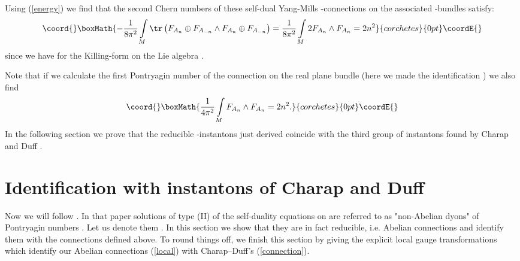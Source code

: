 \documentclass[a4paper,12pt,draft]{article}
\begin{document}
Using (\ref{energy}) we find that the second Chern numbers of these
self-dual Yang-Mills \coordHE{}-connections \coordHE{} on the 
associated \coordHE{}-bundles \coordHE{} satisfy: 
\[\coord{}\boxMath{-{1\over 8\pi^2}\int\limits_M\tr\left( F_{A_n}\oplus
F_{A_{-n}}\wedge F_{A_n}\oplus F_{A_{-n}}\right)={1\over
8\pi^2} \int\limits_M 2F_{A_n}\wedge F_{A_n}=2n^2}{corchetes}{0pt}\coordE{}\]
since we have \coordHE{} for the Killing-form on
the Lie algebra \coordHE{}. 

Note that if we calculate the first Pontryagin number of the connection
\coordHE{} on the real plane bundle \coordHE{} 
(here we made the identification \coordHE{}) 
we also find
\[\coord{}\boxMath{{1\over 4\pi^2}\int\limits_M F_{A_n}\wedge F_{A_n} = 2n^2.}{corchetes}{0pt}\coordE{}\]
In the following section we prove that the reducible \coordHE{}-instantons just
derived coincide with the third group of instantons  found by 
Charap and Duff \cite{charap-duff}.



\section{Identification with instantons of Charap and Duff}



Now we will follow \cite{charap-duff}. In that paper solutions of type  
(II) of the self-duality equations on \coordHE{} 
are referred to as "non-Abelian dyons"
of Pontryagin numbers \coordHE{}. Let us denote them \coordHE{}. 
In this section we show that they are in fact  
reducible, i.e.  
Abelian connections and identify them with the connections \coordHE{} 
defined above. To round things off, we finish this section by giving 
the explicit local gauge transformations which identify our Abelian 
connections (\ref{local}) with Charap--Duff's (\ref{connection}).
\end{document}
